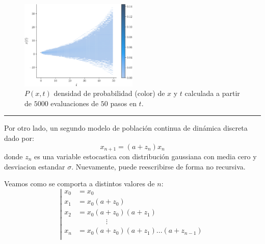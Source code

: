 \documentclass[twocolumn,aps,prl]{revtex4-1}
\newcommand{\nSimulacionesB}{5000}
\newcommand{\Nsteps}{50}
\newcommand*\sepline{%
  \begin{center}
    \rule[1ex]{.5\textwidth}{.5pt}
  \end{center}}
\begin{document}
\begin{figure}  
  \centering  
  \includegraphics[width=0.5\textwidth]{figuras/ex02-histograma.pdf}
  \caption{$P(x,t)$ densidad de probabilidad (color) de $x$ y $t$ calculada a partir de $\nSimulacionesB$ evaluaciones de $\Nsteps$ pasos en $t$.}
  \label{fig:ultima_iteracion}
\end{figure}

\sepline

Por otro lado, un segundo modelo de población continua de dinámica discreta dado por:
\begin{equation}\label{ec:map02}
  x_{n+1} = (a + z_n) x_n
\end{equation}
donde $z_n$ es una variable estocastica con distribución gaussiana con media cero y desviacion estandar $\sigma$. Nuevamente, puede reescribirse de forma no recursiva.

Veamos como se comporta a distintos valores de $n$:
$$\left\vert
\begin{aligned}
  x_0 &=     x_0 \\
  x_1 &= x_0 (a + z_0) \\
  x_2 &= x_0 (a + z_0) (a + z_1)\\
      & \qquad \qquad \vdots \\
  x_n &= x_0 (a + z_0) (a + z_1) ... (a + z_{n-1})\\
\end{aligned}\right.
$$
\end{document}
